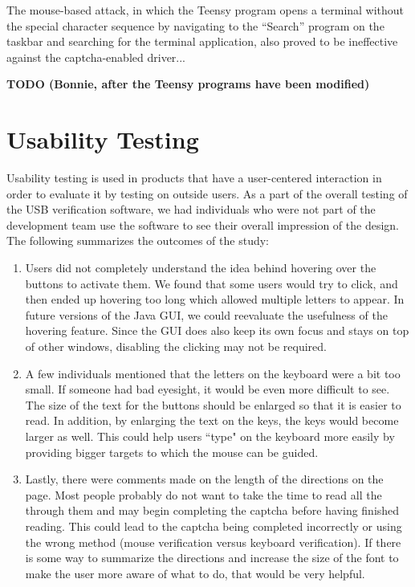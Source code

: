 \documentclass[pagenumbers]{ieee}
\begin{document}
\begin{itemize}
The mouse-based attack, in which the Teensy program opens a terminal without the special character sequence by navigating to the ``Search'' program on the taskbar and searching for the terminal application, also proved to be ineffective against the captcha-enabled driver...

\textbf{TODO (Bonnie, after the Teensy programs have been modified)}

\end{itemize}


\section{Usability Testing}
\label{section:usability}

Usability testing is used in products that have a user-centered interaction in order to evaluate it by testing on outside users. As a part of the overall testing of the USB verification software, we had individuals who were not part of the development team use the software to see their overall impression of the design. The following summarizes  the outcomes of the study:
\begin{enumerate}
\item Users did not completely understand the idea behind hovering over the buttons to activate them. We found that some users would try to click, and then ended up hovering too long which allowed multiple letters to appear. In future versions of the Java GUI, we could reevaluate the usefulness of the hovering feature. Since the GUI does also keep its own focus and stays on top of other windows, disabling the clicking may not be required. 
\item A few individuals mentioned that the letters on the keyboard were a bit too small. If someone had bad eyesight, it would be even more difficult to see. The size of the text for the buttons should be enlarged so that it is easier to read. In addition, by enlarging the text on the keys, the keys would become larger as well. This could help users ``type" on the keyboard more easily by providing bigger targets to which the mouse can be guided.
\item Lastly, there were comments made on the length of the directions on the page. Most people probably do not want to take the time to read all the through them and may begin completing the captcha before having finished reading. This could lead to the captcha being completed incorrectly or using the wrong method (mouse verification versus keyboard verification). If there is some way to summarize the directions and increase the size of the font to make the user more aware of what to do, that would be very helpful.
\end{enumerate}
\end{document}
